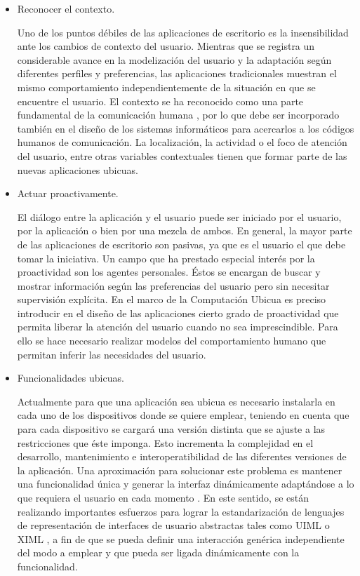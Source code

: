 \begin{itemize}
 
\item Reconocer el contexto. 

Uno de los puntos débiles de las aplicaciones de escritorio es la insensibilidad
ante los cambios de contexto del usuario.
Mientras que se registra un considerable avance en la modelización del usuario
y la adaptación según diferentes perfiles y preferencias, las aplicaciones
tradicionales muestran el mismo comportamiento independientemente de la
situación en que se encuentre el usuario. El contexto se ha reconocido como
una parte fundamental de la comunicación humana \cite{cap1.69}, por lo que
debe ser incorporado también en el diseño de los sistemas informáticos para
acercarlos a los códigos humanos de comunicación. La localización, la actividad o
el foco de atención del usuario, entre otras variables contextuales tienen que
formar parte de las nuevas aplicaciones ubicuas.

\item Actuar proactivamente. 

El diálogo entre la aplicación y el usuario puede
ser iniciado por el usuario, por la aplicación o bien por una
mezcla de ambos. En general, la mayor parte de las aplicaciones de escritorio
son pasivas, ya que es el usuario el que debe tomar la iniciativa. Un
campo que ha prestado especial interés por la proactividad son los agentes
personales. Éstos se encargan de buscar y mostrar información según las
preferencias del usuario pero sin necesitar supervisión explícita. En el marco
de la Computación Ubicua es preciso introducir en el diseño de las aplicaciones
cierto grado de proactividad que permita liberar la atención del usuario
cuando no sea imprescindible. Para ello se hace necesario realizar modelos
del comportamiento humano \cite{cap1.198} que permitan inferir las
necesidades del usuario.

\item Funcionalidades ubicuas. 

Actualmente para que una aplicación sea ubicua
es necesario instalarla en cada uno de los dispositivos donde se quiere emplear,
teniendo en cuenta que para cada dispositivo se cargará una versión distinta que
se ajuste a las restricciones que éste imponga. Esto incrementa la complejidad
en el desarrollo, mantenimiento e interoperatibilidad de las diferentes
versiones de la aplicación. Una aproximación para solucionar este problema es
mantener una funcionalidad única y generar la interfaz dinámicamente adaptándose
a lo que requiera el usuario en cada momento \cite{cap1.205}. En este
sentido, se están realizando importantes esfuerzos para lograr la estandarización de lenguajes de
representación de interfaces de usuario abstractas tales como UIML \cite{cap1.16} o
XIML \cite{cap1.214}, a fin de que se pueda definir una interacción genérica
independiente del modo a emplear y que pueda ser ligada dinámicamente con la funcionalidad.
\end{itemize}

